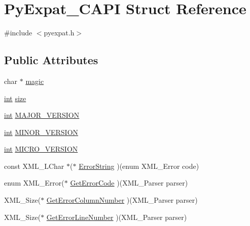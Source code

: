 \hypertarget{struct_py_expat___c_a_p_i}{}\section{Py\+Expat\+\_\+\+C\+A\+PI Struct Reference}
\label{struct_py_expat___c_a_p_i}


{\ttfamily \#include $<$pyexpat.\+h$>$}

\subsection*{Public Attributes}
\begin{DoxyCompactItemize}
\item 
char $\ast$ \mbox{\hyperlink{struct_py_expat___c_a_p_i_a30fce229975c2354354560dd2e906dc3}{magic}}
\item 
\mbox{\hyperlink{warnings_8h_a74f207b5aa4ba51c3a2ad59b219a423b}{int}} \mbox{\hyperlink{struct_py_expat___c_a_p_i_af92677867a91271e628f211a96c9b5df}{size}}
\item 
\mbox{\hyperlink{warnings_8h_a74f207b5aa4ba51c3a2ad59b219a423b}{int}} \mbox{\hyperlink{struct_py_expat___c_a_p_i_a584f37c57c8604474f31abda36f06055}{M\+A\+J\+O\+R\+\_\+\+V\+E\+R\+S\+I\+ON}}
\item 
\mbox{\hyperlink{warnings_8h_a74f207b5aa4ba51c3a2ad59b219a423b}{int}} \mbox{\hyperlink{struct_py_expat___c_a_p_i_a4254d96093f733cbed41fded6308b334}{M\+I\+N\+O\+R\+\_\+\+V\+E\+R\+S\+I\+ON}}
\item 
\mbox{\hyperlink{warnings_8h_a74f207b5aa4ba51c3a2ad59b219a423b}{int}} \mbox{\hyperlink{struct_py_expat___c_a_p_i_abd706f536a4b44a93c5207a7e568ce9a}{M\+I\+C\+R\+O\+\_\+\+V\+E\+R\+S\+I\+ON}}
\item 
const X\+M\+L\+\_\+\+L\+Char $\ast$($\ast$ \mbox{\hyperlink{struct_py_expat___c_a_p_i_af7c49b4a394f57108377beb4690ccdf9}{Error\+String}} )(enum X\+M\+L\+\_\+\+Error code)
\item 
enum X\+M\+L\+\_\+\+Error($\ast$ \mbox{\hyperlink{struct_py_expat___c_a_p_i_ae4ba4b470a4d80ba107c556eada59492}{Get\+Error\+Code}} )(X\+M\+L\+\_\+\+Parser parser)
\item 
X\+M\+L\+\_\+\+Size($\ast$ \mbox{\hyperlink{struct_py_expat___c_a_p_i_a52fccb9618f4a0db6c6a5ef8f799f4f7}{Get\+Error\+Column\+Number}} )(X\+M\+L\+\_\+\+Parser parser)
\item 
X\+M\+L\+\_\+\+Size($\ast$ \mbox{\hyperlink{struct_py_expat___c_a_p_i_a238c98224fe4c4761527fdb823e565cd}{Get\+Error\+Line\+Number}} )(X\+M\+L\+\_\+\+Parser parser)

\end{DoxyCompactItemize}
